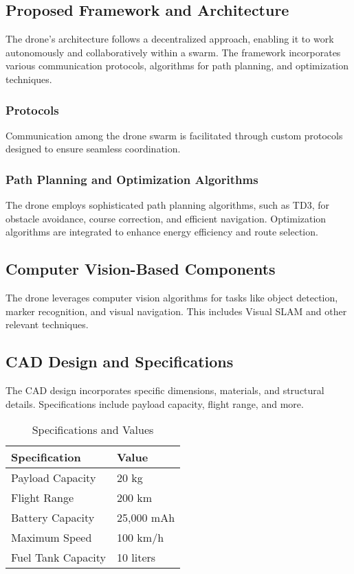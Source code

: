 \documentclass[preprint,12pt]{elsarticle}
\begin{document}
\subsection{Proposed Framework and Architecture}
The drone's architecture follows a decentralized approach, enabling it to work autonomously and collaboratively within a swarm. The framework incorporates various communication protocols, algorithms for path planning, and optimization techniques.

\subsubsection{Protocols}
Communication among the drone swarm is facilitated through custom protocols designed to ensure seamless coordination.

\subsubsection{Path Planning and Optimization Algorithms}
The drone employs sophisticated path planning algorithms, such as TD3, for obstacle avoidance, course correction, and efficient navigation. Optimization algorithms are integrated to enhance energy efficiency and route selection.

\subsection{Computer Vision-Based Components}
The drone leverages computer vision algorithms for tasks like object detection, marker recognition, and visual navigation. This includes Visual SLAM and other relevant techniques.

\subsection{CAD Design and Specifications}
The CAD design incorporates specific dimensions, materials, and structural details. Specifications include payload capacity, flight range, and more.


\begin{table}[!htbp]
\centering
\caption{Specifications and Values}
\begin{tabular}{|l|l|}
\hline
Specification       & Value             \\
\hline
Payload Capacity    & 20 kg             \\
Flight Range        & 200 km            \\
Battery Capacity    & 25,000 mAh        \\
Maximum Speed       & 100 km/h          \\
Fuel Tank Capacity   & 10 liters         \\
\hline
\end{tabular}
\end{table}
\end{document}
